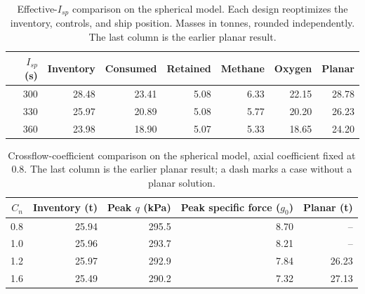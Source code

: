 \begin{table}[htbp]
\centering
\caption{Effective-$I_{sp}$ comparison on the spherical model. Each design reoptimizes the inventory, controls, and ship position. Masses in tonnes, rounded independently. The last column is the earlier planar result.}
\label{tab:p3-isp-budget}
\begin{tabular}{@{}rrrrrrr@{}}
\toprule
$I_{sp}$ (s) & Inventory & Consumed & Retained & Methane & Oxygen & Planar \\
\midrule
300 & 28.48 & 23.41 & 5.08 & 6.33 & 22.15 & 28.78 \\
330 & 25.97 & 20.89 & 5.08 & 5.77 & 20.20 & 26.23 \\
360 & 23.98 & 18.90 & 5.07 & 5.33 & 18.65 & 24.20 \\
\bottomrule
\end{tabular}
\end{table}

\begin{table}[htbp]
\centering
\caption{Crossflow-coefficient comparison on the spherical model, axial coefficient fixed at 0.8. The last column is the earlier planar result; a dash marks a case without a planar solution.}
\label{tab:p3-drag}
\begin{tabular}{@{}rrrrr@{}}
\toprule
$C_n$ & Inventory (t) & Peak $q$ (kPa) & Peak specific force ($g_0$) & Planar (t) \\
\midrule
0.8 & 25.94 & 295.5 & 8.70 & -- \\
1.0 & 25.96 & 293.7 & 8.21 & -- \\
1.2 & 25.97 & 292.9 & 7.84 & 26.23 \\
1.6 & 25.49 & 290.2 & 7.32 & 27.13 \\
\bottomrule
\end{tabular}
\end{table}
